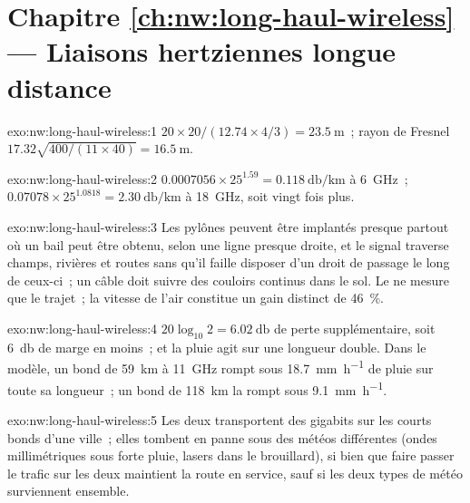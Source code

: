 \section*{Chapitre \ref{ch:nw:long-haul-wireless} --- Liaisons hertziennes longue distance}

\begin{solution}{exo:nw:long-haul-wireless:1}
 $20 \times 20 / (12.74 \times 4/3) = \qty{23.5}{\metre}$~; rayon de Fresnel $17.32\sqrt{400/(11 \times 40)} = \qty{16.5}{\metre}$.
\end{solution}

\begin{solution}{exo:nw:long-haul-wireless:2}
$0.0007056 \times 25^{1.59} = \qty{0.118}{\decibel\per\kilo\metre}$ à \qty{6}{\giga\hertz}~; $0.07078 \times 25^{1.0818} = \qty{2.30}{\decibel\per\kilo\metre}$ à
\qty{18}{\giga\hertz}, soit vingt fois plus.
\end{solution}

\begin{solution}{exo:nw:long-haul-wireless:3}
Les pylônes peuvent être implantés presque partout où un bail peut être obtenu, selon une ligne presque droite, et le signal traverse champs, rivières et routes sans
qu'il faille disposer d'un droit de passage le long de ceux-ci~; un câble doit suivre des couloirs continus dans le sol. Le  ne mesure que le trajet~;
la vitesse de l'air constitue un gain distinct de 46~\%.
\end{solution}

\begin{solution}{exo:nw:long-haul-wireless:4}
$20\log_{10} 2 = \qty{6.02}{\decibel}$ de perte supplémentaire, soit \qty{6}{\decibel} de marge en moins~; et la pluie agit sur une longueur double. Dans le modèle, un bond de \qty{59}{\kilo\metre}
à \qty{11}{\giga\hertz} rompt sous \qty{18.7}{\milli\metre\per\hour} de pluie sur toute sa longueur~; un bond de \qty{118}{\kilo\metre} la rompt sous \qty{9.1}{\milli\metre\per\hour}.
\end{solution}

\begin{solution}{exo:nw:long-haul-wireless:5}
Les deux transportent des gigabits sur les courts bonds d'une ville~; elles tombent en panne sous des météos différentes (ondes millimétriques sous forte pluie, lasers dans le brouillard), si bien que faire passer
le trafic sur les deux maintient la route en service, sauf si les deux types de météo surviennent ensemble.
\end{solution}

